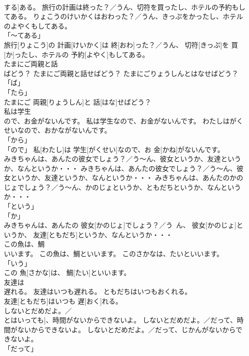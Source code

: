 \documentclass[8pt]{extreport}
\begin{document}
\begin{CJK}{UTF8}{min}
\\	する]ある。	旅行の計画は終った？／うん、切符を買ったし、ホテルの予約もしてある。	りょこうのけいかくはおわった？／うん、きっぷをかったし、ホテルのよやくもしてある。	
\\	「～てある」 
\\	旅行[りょこう]の 計画[けいかく]は 終[おわ]った？／うん、 切符[きっぷ]を 買[か]ったし、ホテルの 予約[よやく]もしてある。		
\\	たまにご両親と話
\\	ばどう？	たまにご両親と話せばどう？	たまにごりょうしんとはなせばどう？	
\\	「ば」 
\\	「たら」 
\\	たまにご 両親[りょうしん]と 話[はな]せばどう？		
\\	私は学生
\\	ので、お金がないんです。	私は学生なので、お金がないんです。	わたしはがくせいなので、おかながないんです。	
\\	「から」 
\\	「ので」	私[わたし]は 学生[がくせい]なので、お 金[かね]がないんです。		
\\	みきちゃんは、あんたの彼女でしょう？／う～ん、彼女というか、友達というか、なんというか・・・	みきちゃんは、あんたの彼女でしょう？／う～ん、彼女というか、友達というか、なんというか・・・	みきちゃんは、あんたのかのじょでしょう？／う～ん、かのじょというか、ともだちというか、なんというか・・・	
\\	「という」 
\\	「か」 
\\	みきちゃんは、あんたの 彼女[かのじょ]でしょう？／う~ん、 彼女[かのじょ]というか、 友達[ともだち]というか、なんというか・・・		
\\	この魚は、鯛
\\	いいます。	この魚は、鯛といいます。	このさかなは、たいといいます。	
\\	「いう」 
\\	この 魚[さかな]は、 鯛[たい]といいます。		
\\	友達は
\\	遅れる。	友達はいつも遅れる。	ともだちはいつもおくれる。	
\\	友達[ともだち]はいつも 遅[おく]れる。		
\\	しないとだめだよ。／
\\	とはいっても]、時間がないからできないよ。	しないとだめだよ。／だって、時間がないからできないよ。	しないとだめだよ。／だって、じかんがないからできないよ。	
\\	「だって」 

\end{CJK}
\end{document}
